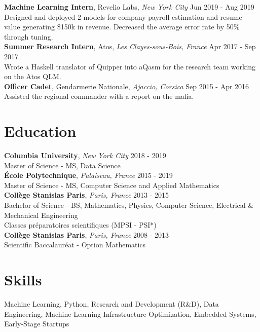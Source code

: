 \documentclass[a4paper,9pt]{article}
\begin{document}
    \noindent\textbf{Machine Learning Intern}, Revelio Labs, \textit{New York City} \hfill Jun 2019 - Aug 2019\\
    Designed and deployed 2 models for company payroll estimation and resume value generating \$150k in revenue. Decreased the average error rate by 50\% through tuning.\\

    \noindent\textbf{Summer Research Intern}, Atos, \textit{Les Clayes-sous-Bois, France} \hfill Apr 2017 - Sep 2017\\
    Wrote a Haskell translator of Quipper into aQasm for the research team working on the Atos QLM.\\

    \noindent\textbf{Officer Cadet}, Gendarmerie Nationale, \textit{Ajaccio, Corsica} \hfill Sep 2015 - Apr 2016\\
    Assisted the regional commander with a report on the mafia.

    \section*{Education}

    \noindent\textbf{Columbia University}, \textit{New York City} \hfill 2018 - 2019\\
    Master of Science - MS, Data Science\\

    \noindent\textbf{École Polytechnique}, \textit{Palaiseau, France} \hfill 2015 - 2019\\
    Master of Science - MS, Computer Science and Applied Mathematics\\

    \noindent\textbf{Collège Stanislas Paris}, \textit{Paris, France} \hfill 2013 - 2015\\
    Bachelor of Science - BS, Mathematics, Physics, Computer Science, Electrical \& Mechanical Engineering\\
    Classes préparatoires scientifiques (MPSI - PSI*)\\

    \noindent\textbf{Collège Stanislas Paris}, \textit{Paris, France} \hfill 2008 - 2013\\
    Scientific Baccalauréat - Option Mathematics\\

    \section*{Skills}
    Machine Learning, Python, Research and Development (R\&D), Data Engineering, Machine Learning Infrastructure Optimization, Embedded Systems, Early-Stage Startups
\end{document}
